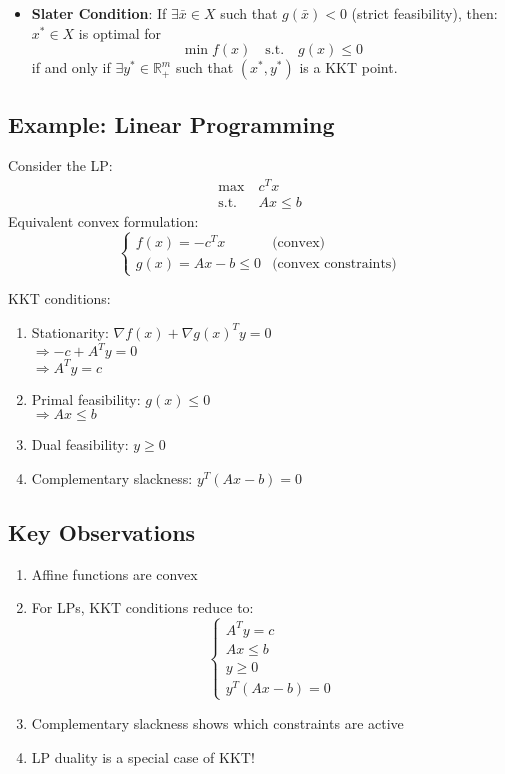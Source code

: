 \documentclass{article}
\begin{document}
\begin{itemize} \item \textbf{Slater Condition}: If $\exists \bar{x} \in X$
such that $g(\bar{x}) < 0$ (strict feasibility), then: $x^* \in X$ is optimal
for \[ \min f(x) \quad \text{s.t.} \quad g(x) \leq 0 \] if and only if $\exists
y^* \in \mathbb{R}^m_+$ such that $(x^*, y^*)$ is a KKT point. \end{itemize}

\subsection*{Example: Linear Programming} Consider the LP: \[ \begin{aligned}
\max\ & c^T x \\ \text{s.t.}\ & Ax \leq b \end{aligned} \] Equivalent convex
formulation: \[ \begin{cases} f(x) = -c^T x & \text{(convex)} \\ g(x) = Ax - b
\leq 0 & \text{(convex constraints)} \end{cases} \]

KKT conditions: \begin{enumerate} \item Stationarity: $\nabla f(x) + \nabla
g(x)^T y = 0$ \\ $\Rightarrow -c + A^T y = 0$ \\ $\Rightarrow A^T y = c$ \item
Primal feasibility: $g(x) \leq 0$ \\ $\Rightarrow Ax \leq b$ \item Dual
feasibility: $y \geq 0$ \item Complementary slackness: $y^T(Ax - b) = 0$
\end{enumerate}

\subsection*{Key Observations} \begin{enumerate} \item Affine functions are
convex \item For LPs, KKT conditions reduce to: \[ \begin{cases} A^T y = c \\ Ax
\leq b \\ y \geq 0 \\ y^T(Ax - b) = 0 \end{cases} \] \item Complementary
slackness shows which constraints are active \item LP duality is a special case of KKT! \end{enumerate}
\newpage
\end{document}
